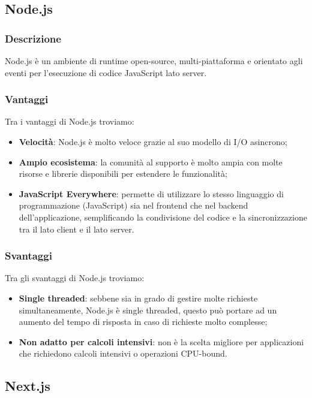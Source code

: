 \subsection*{Node.js}

\subsubsection*{Descrizione}
Node.js è un ambiente di runtime open-source, multi-piattaforma e orientato agli eventi per l'esecuzione di codice JavaScript lato server.

\subsubsection*{Vantaggi}
Tra i vantaggi di Node.js troviamo:
\begin{itemize}
    \item \textbf{Velocità}: Node.js è molto veloce grazie al suo modello di I/O asincrono;
    \item \textbf{Ampio ecosistema}: la comunità al supporto è molto ampia con molte risorse e librerie disponibili per estendere le funzionalità;
    \item \textbf{JavaScript Everywhere}: permette di utilizzare lo stesso linguaggio di programmazione (JavaScript) sia nel frontend che nel backend dell'applicazione, semplificando la condivisione del codice e la sincronizzazione tra il lato client e il lato server.
\end{itemize}

\subsubsection*{Svantaggi}
Tra gli svantaggi di Node.js troviamo:
\begin{itemize}
    \item \textbf{Single threaded}: sebbene sia in grado di gestire molte richieste simultaneamente, Node.js è single threaded, questo può portare ad un aumento del tempo di risposta in caso di richieste molto complesse;
    \item \textbf{Non adatto per calcoli intensivi}: non è la scelta migliore per applicazioni che richiedono calcoli intensivi o operazioni CPU-bound.
\end{itemize}


\subsection*{Next.js}

